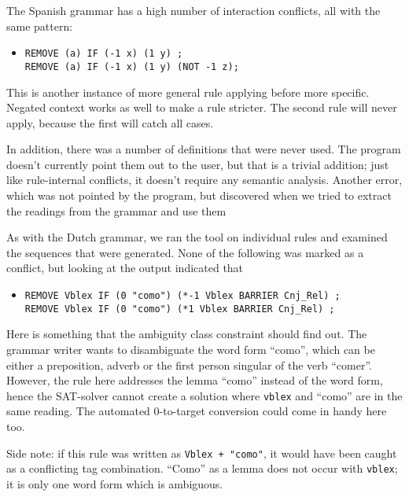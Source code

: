 The Spanish grammar has a high number of interaction conflicts, all with the same pattern:

\begin{itemize}
\item[] 
\begin{verbatim}REMOVE (a) IF (-1 x) (1 y) ;
REMOVE (a) IF (-1 x) (1 y) (NOT -1 z);
\end{verbatim}
\end{itemize}


This is another instance of more general rule applying before more specific. Negated context works as well to make a rule stricter. The second rule will never apply, because the first will catch all cases.

In addition, there was a number of definitions that were never used. The program doesn't currently point them out to the user, but that is a trivial addition; just like rule-internal conflicts, it doesn't require any semantic analysis. 
Another error, which was not pointed by the program, but discovered when we tried to extract the readings from the grammar and use them 



As with the Dutch grammar, we ran the tool on individual rules and examined the sequences that were generated. None of the following was marked as a conflict, but looking at the output indicated that 

\begin{itemize}
\item[] 
\begin{verbatim}
REMOVE Vblex IF (0 "como") (*-1 Vblex BARRIER Cnj_Rel) ;
REMOVE Vblex IF (0 "como") (*1 Vblex BARRIER Cnj_Rel) ;
\end{verbatim}
\end{itemize}

Here is something that the ambiguity class constraint should find out.
The grammar writer wants to disambiguate the word form ``como'', which can be either a preposition, adverb or the first person singular of the verb ``comer''. 
However, the rule here addresses the lemma ``como'' instead of the word form, hence the SAT-solver cannot create a solution where \texttt{vblex} and ``como'' are in the same reading. The automated 0-to-target conversion could come in handy here too.

Side note: if this rule was written as \texttt{Vblex + "como"}, it would have been caught as a conflicting tag combination. ``Como'' as a lemma does not occur with \texttt{vblex}; it is only one word form which is ambiguous.

